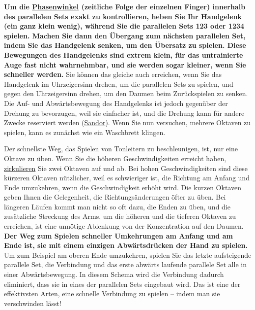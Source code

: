 \textbf{Um die \hyperref[c1iv2a]{Phasenwinkel} (zeitliche Folge der einzelnen Finger) innerhalb des parallelen Sets exakt zu kontrollieren, heben Sie Ihr Handgelenk (ein ganz klein wenig), während Sie die parallelen Sets 123 oder 1234 spielen.
Machen Sie dann den Übergang zum nächsten parallelen Set, indem Sie das Handgelenk senken, um den Übersatz zu spielen.
Diese Bewegungen des Handgelenks sind extrem klein, für das untrainierte Auge fast nicht wahrnehmbar, und sie werden sogar kleiner, wenn Sie schneller werden.}
Sie können das gleiche auch erreichen, wenn Sie das Handgelenk im Uhrzeigersinn drehen, um die parallelen Sets zu spielen, und gegen den Uhrzeigersinn drehen, um den Daumen beim Zurückspielen zu senken.
Die Auf- und Abwärtsbewegung des Handgelenks ist jedoch gegenüber der Drehung zu bevorzugen, weil sie einfacher ist, und die Drehung kann für andere Zwecke reserviert werden (\hyperref[Sandor]{Sandor}).
Wenn Sie nun versuchen, mehrere Oktaven zu spielen, kann es zunächst wie ein Waschbrett klingen.

Der schnellste Weg, das Spielen von Tonleitern zu beschleunigen, ist, nur eine Oktave zu üben.
Wenn Sie die höheren Geschwindigkeiten erreicht haben, \hyperref[c1iii2]{zirkulieren} Sie zwei Oktaven auf und ab.
Bei hohen Geschwindigkeiten sind diese kürzeren Oktaven nützlicher, weil es schwieriger ist, die Richtung am Anfang und Ende umzukehren, wenn die Geschwindigkeit erhöht wird.
Die kurzen Oktaven geben Ihnen die Gelegenheit, die Richtungsänderungen öfter zu üben.
Bei längeren Läufen kommt man nicht so oft dazu, die Enden zu üben, und die zusätzliche Streckung des Arms, um die höheren und die tieferen Oktaven zu erreichen, ist eine unnötige Ablenkung von der Konzentration auf den Daumen.
\textbf{Der Weg zum Spielen schneller Umkehrungen am Anfang und am Ende ist, sie mit einem einzigen Abwärtsdrücken der Hand zu spielen.}
Um zum Beispiel am oberen Ende umzukehren, spielen Sie das letzte aufsteigende parallele Set, die Verbindung und das erste abwärts laufende parallele Set alle in einer Abwärtsbewegung.
In diesem Schema wird die Verbindung dadurch eliminiert, dass sie in eines der parallelen Sets eingebaut wird.
Das ist eine der effektivsten Arten, eine schnelle Verbindung zu spielen -- indem man sie verschwinden lässt!

